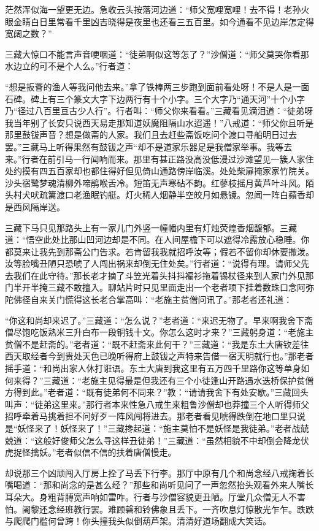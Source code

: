 \documentclass[12pt,UTF8]{ctexbook}
\begin{document}
茫然浑似海一望更无边。急收云头按落河边道：“师父宽哩宽哩！去不得！老孙火眼金睛白日里常看千里凶吉晓得是夜里也还看三五百里。如今通看不见边岸怎定得宽阔之数？”

三藏大惊口不能言声音哽咽道：“徒弟啊似这等怎了？”沙僧道：“师父莫哭你看那水边立的可不是个人么。”行者道：

“想是扳罾的渔人等我问他去来。”拿了铁棒两三步跑到面前看处呀！不是人是一面石碑。碑上有三个篆文大字下边两行有十个小字。三个大字乃“通天河”十个小字乃“径过八百里亘古少人行”。行者叫：“师父你来看看。”三藏看见滴泪道：“徒弟呀我当年别了长安只说西天易走那知道妖魔阻隔山水迢遥！”八戒道：“师父你且听是那里鼓钹声音？想是做斋的人家。我们且去赶些斋饭吃问个渡口寻船明日过去罢。”三藏马上听得果然有鼓钹之声“却不是道家乐器足是我僧家举事。我等去来。”行者在前引马一行闻响而来。那里有甚正路没高没低漫过沙滩望见一簇人家住处约摸有四五百家却也都住得好但见倚山通路傍岸临溪。处处柴扉掩家家竹院关。沙头宿鹭梦魂清柳外啼鹃喉舌冷。短笛无声寒砧不韵。红蓼枝摇月黄芦叶斗风。陌头村犬吠疏篱渡口老渔眠钓艇。灯火稀人烟静半空皎月如悬镜。忽闻一阵白蘋香却是西风隔岸送。

三藏下马只见那路头上有一家儿门外竖一幢幡内里有灯烛荧煌香烟馥郁。三藏道：“悟空此处比那山凹河边却是不同。在人间屋檐下可以遮得冷露放心稳睡。你都莫来让我先到那斋公门告求。若肯留我我就招呼汝等；假若不留你却休要撒泼。汝等脸嘴丑陋只恐唬了人闯出祸来却倒无住处矣。”行者道：“说得有理。请师父先去我们在此守待。”那长老才摘了斗笠光着头抖抖褊衫拖着锡杖径来到人家门外见那门半开半掩三藏不敢擅入。聊站片时只见里面走出一个老者项下挂着数珠口念阿弥陀佛径自来关门慌得这长老合掌高叫：“老施主贫僧问讯了。”那老者还礼道：

“你这和尚却来迟了。”三藏道：“怎么说？”老者道：“来迟无物了。早来啊我舍下斋僧尽饱吃饭熟米三升白布一段铜钱十文。你怎么这时才来？”三藏躬身道：“老施主贫僧不是赶斋的。”老者道：“既不赶斋来此何干？”三藏道：“我是东土大唐钦差往西天取经者今到贵处天色已晚听得府上鼓钹之声特来告借一宿天明就行也。”那老者摇手道：“和尚出家人休打诳语。东土大唐到我这里有五万四千里路你这等单身如何来得？”三藏道：“老施主见得最是但我还有三个小徒逢山开路遇水迭桥保护贫僧方得到此。”老者道：“既有徒弟何不同来？”教：“请请我舍下有处安歇。”三藏回头叫声：“徒弟这里来。”那行者本来性急八戒生来粗鲁沙僧却也莽撞三个人听得师父招呼牵着马挑着担不问好歹一阵风闯将进去。那老者看见唬得跌倒在地口里只说是“妖怪来了！妖怪来了！”三藏搀起道：“施主莫怕不是妖怪是我徒弟。”老者战兢兢道：“这般好俊师父怎么寻这样丑徒弟！”三藏道：“虽然相貌不中却倒会降龙伏虎捉怪擒妖。”老者似信不信的扶着唐僧慢走。

却说那三个凶顽闯入厅房上拴了马丢下行李。那厅中原有几个和尚念经八戒掬着长嘴喝道：“那和尚念的是甚么经？”那些和尚听见问了一声忽然抬头观看外来人嘴长耳朵大。身粗背膊宽声响如雷咋。行者与沙僧容貌更丑陋。厅堂几众僧无人不害怕。阇黎还念经班教行罢。难顾磬和铃佛象且丢下。一齐吹息灯惊散光乍乍。跌跌与爬爬门槛何曾跨！你头撞我头似倒葫芦架。清清好道场翻成大笑话。
\end{document}
